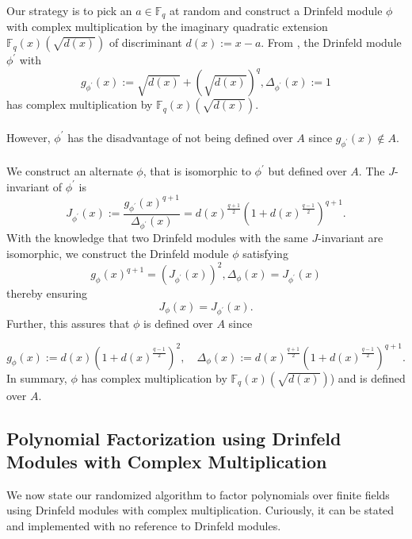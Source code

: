 \documentclass[12pt]{article}
\theoremstyle{plain}
\theoremstyle{definition}
\def\F{\ensuremath{\mathbb{F}}}
\newcommand{\D}{\Delta}
\begin{document}
Our strategy is to pick an $a \in \F_q$ at random and construct a Drinfeld module $\phi$ with complex multiplication by the imaginary quadratic extension $\F_q(x)(\sqrt{d(x)})$ of discriminant $d(x):=x-a$. From \cite{dor}, the Drinfeld module $\phi^\prime$ with $$g_{\phi^\prime}(x):=\sqrt{d(x)}+\left(\sqrt{d(x)}\right)^q, \D_{\phi^\prime}(x) := 1$$ has complex multiplication by $\F_q(x)(\sqrt{d(x)})$.\\ \\
However, $\phi^\prime$ has the disadvantage of not being defined over $A$ since $g_{\phi^\prime}(x) \notin A$.\\ \\
We construct an alternate $\phi$, that is isomorphic to $\phi^\prime$ but defined over $A$. The $J$-invariant \cite{gek} of $\phi^\prime$ is $$J_{\phi^\prime}(x) := \frac{g_{\phi^\prime}(x)^{q+1}}{\D_{\phi^\prime}(x)} = d(x)^{\frac{q+1}{2}}\left(1+d(x)^{\frac{q-1}{2}}\right)^{q+1}.$$
With the knowledge that two Drinfeld modules with the same $J$-invariant are isomorphic, we construct the Drinfeld module $\phi$ satisfying $$g_\phi(x)^{q+1} = (J_{\phi^\prime}(x))^2, \D_{\phi}(x)= J_{\phi^\prime}(x)$$ thereby ensuring $$J_{\phi}(x)=J_{\phi^\prime}(x).$$ Further, this assures that $\phi$ is defined over $A$ since

$$g_\phi(x):=d(x)(1+d(x)^{\frac{q-1}{2}})^2, \quad 
\D_\phi(x):=d(x)^{\frac{q+1}{2}}(1+d(x)^{\frac{q-1}{2}})^{q+1}.$$
In summary, $\phi$ has complex multiplication by $\F_q(x)(\sqrt{d(x)})$) and is defined over $A$.
\subsection{Polynomial Factorization using Drinfeld Modules with Complex Multiplication}
We now state our randomized algorithm to factor polynomials over finite fields using Drinfeld modules with complex multiplication. Curiously, it can be stated and implemented with no reference to Drinfeld modules.
\end{document}

